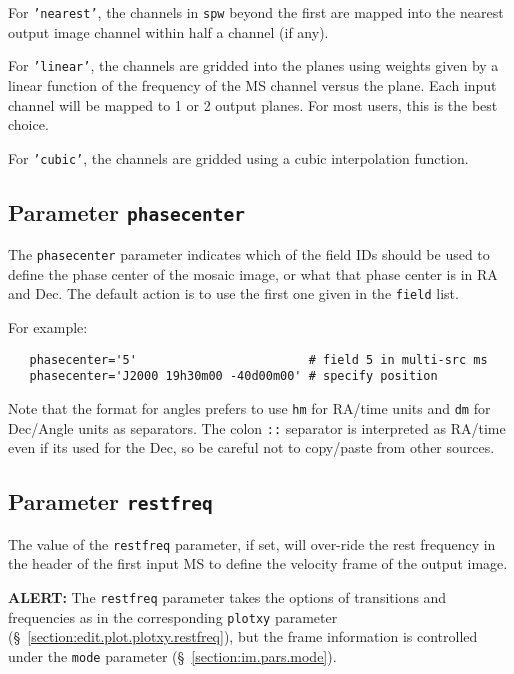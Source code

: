 For {\tt 'nearest'}, the channels in {\tt spw} beyond the first are
mapped into the nearest output image channel within half a channel (if
any).

For {\tt 'linear'}, the channels are gridded into the planes using
weights given by a linear function of the frequency of the MS channel
versus the plane.  Each input channel will be mapped to 1 or 2 output
planes.  For most users, this is the best choice.

For {\tt 'cubic'}, the channels are gridded using a cubic
interpolation function.  

\subsection{Parameter {\tt phasecenter} }
\label{section:im.pars.phasecenter}

The {\tt phasecenter} parameter indicates which of the field IDs 
should be used to define the phase center of the mosaic image,
or what that phase center is in RA and Dec.
The default action is to use the first one given in the 
{\tt field} list.

For example:
\small
\begin{verbatim}
   phasecenter='5'                        # field 5 in multi-src ms
   phasecenter='J2000 19h30m00 -40d00m00' # specify position
\end{verbatim}
\normalsize

Note that the format for angles prefers to use {\tt hm} for RA/time
units and {\tt dm} for Dec/Angle units as separators.  The colon
{\tt ::} separator is interpreted as RA/time even if its used for the
Dec, so be careful not to copy/paste from other sources.

\subsection{Parameter {\tt restfreq} }
\label{section:im.pars.restfreq}

The value of the {\tt restfreq} parameter, if set, will over-ride
the rest frequency in the header of the first input MS to define
the velocity frame of the output image.

{\bf ALERT:} The {\tt restfreq} parameter takes the options
of transitions and frequencies as in the corresponding {\tt plotxy}
parameter (\S~\ref{section:edit.plot.plotxy.restfreq}), but the
frame information is controlled under the {\tt mode} parameter
(\S~\ref{section:im.pars.mode}).

